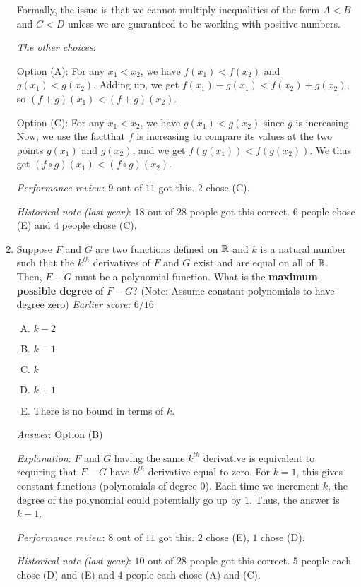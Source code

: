 \documentclass[10pt]{amsart}
\begin{document}
\begin{enumerate}
  Formally, the issue is that we cannot multiply inequalities of the
  form $A < B$ and $C < D$ unless we are guaranteed to be working with
  positive numbers.

  {\em The other choices}:

  Option (A): For any $x_1 <
  x_2$, we have $f(x_1) < f(x_2)$ and $g(x_1) < g(x_2)$. Adding up, we
  get $f(x_1) + g(x_1) < f(x_2) + g(x_2)$, so $(f + g)(x_1) < (f + g)(x_2)$.

  Option (C): For any $x_1 < x_2$, we have $g(x_1) < g(x_2)$ since $g$
  is increasing. Now, we use the factthat $f$ is increasing to compare
  its values at the two points $g(x_1)$ and $g(x_2)$, and we get
  $f(g(x_1)) < f(g(x_2))$. We thus get $(f \circ g)(x_1) < (f \circ
  g)(x_2)$.

  {\em Performance review}: $9$ out of $11$ got this. $2$ chose (C).

  {\em Historical note (last year)}: $18$ out of $28$ people got this
  correct. $6$ people chose (E) and $4$ people chose (C).

\item Suppose $F$ and $G$ are two functions defined on $\mathbb{R}$ and $k$ is
  a natural number such that the $k^{th}$ derivatives of $F$ and $G$
  exist and are equal on all of $\mathbb{R}$. Then, $F - G$ must be a
  polynomial function. What is the {\bf maximum possible degree} of $F
  - G$?  (Note: Assume constant polynomials to have degree zero) {\em
  Earlier score: $6/16$}

  \begin{enumerate}[(A)]
  \item $k - 2$
  \item $k - 1$
  \item $k$
  \item $k + 1$
  \item There is no bound in terms of $k$.
  \end{enumerate}

  {\em Answer}: Option (B)

  {\em Explanation}: $F$ and $G$ having the same $k^{th}$ derivative
  is equivalent to requiring that $F - G$ have $k^{th}$ derivative
  equal to zero. For $k = 1$, this gives constant functions
  (polynomials of degree $0$). Each time we increment $k$, the degree
  of the polynomial could potentially go up by $1$. Thus, the answer
  is $k - 1$.

  {\em Performance review}: $8$ out of $11$ got this. $2$ chose (E),
  $1$ chose (D).

  {\em Historical note (last year)}: $10$ out of $28$ people got this
  correct. $5$ people each chose (D) and (E) and $4$ people each chose
  (A) and (C).


\end{enumerate}
\end{document}
